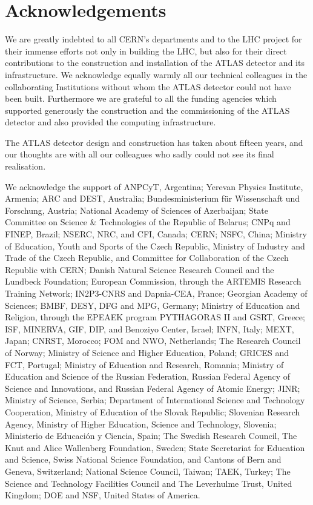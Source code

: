 \documentclass[11pt,a4paper,dvips]{article}
\begin{document}
\section{Acknowledgements}

We are greatly indebted to all CERN's departments and to the LHC project for their immense efforts not only in building the LHC, but also for their direct contributions to the construction and installation of the ATLAS detector and its infrastructure. We acknowledge equally warmly all our technical colleagues in the collaborating Institutions without whom the ATLAS detector could not have been built. Furthermore we are grateful to all the funding agencies which supported generously the construction and the commissioning of the ATLAS detector and also provided the computing infrastructure.

The ATLAS detector design and construction has taken about fifteen years, and our thoughts are with all our colleagues who sadly could not see its final realisation.

We acknowledge the support of ANPCyT, Argentina; Yerevan Physics Institute, Armenia; ARC and DEST, Australia; Bundesministerium f\"ur Wissenschaft und Forschung, Austria; National Academy of Sciences of Azerbaijan; State Committee on Science \& Technologies of the Republic of Belarus; CNPq and FINEP, Brazil; NSERC, NRC, and CFI, Canada; CERN; NSFC, China; Ministry of Education, Youth and Sports of the Czech Republic, Ministry of Industry and Trade of the Czech Republic, and Committee for Collaboration of the Czech Republic with CERN; Danish Natural Science Research Council and the Lundbeck Foundation; European Commission, through the ARTEMIS Research Training Network; IN2P3-CNRS and Dapnia-CEA, France; Georgian Academy of Sciences; BMBF, DESY, DFG and MPG, Germany; Ministry of Education and Religion, through the EPEAEK program PYTHAGORAS II and GSRT, Greece; ISF, MINERVA, GIF, DIP, and Benoziyo Center, Israel; INFN, Italy; MEXT, Japan; CNRST, Morocco; FOM and NWO, Netherlands; The Research Council of Norway; Ministry of Science and Higher Education, Poland; GRICES and FCT, Portugal; Ministry of Education and Research, Romania; Ministry of Education and Science of the Russian Federation, Russian Federal Agency of Science and Innovations, and Russian Federal Agency of Atomic Energy; JINR; Ministry of Science, Serbia; Department of International Science and Technology Cooperation, Ministry of Education of the Slovak Republic; Slovenian Research Agency, Ministry of Higher Education, Science and Technology, Slovenia; Ministerio de Educaci\'{o}n y Ciencia, Spain; The Swedish Research Council, The Knut and Alice Wallenberg Foundation, Sweden; State Secretariat for Education and Science, Swiss National Science Foundation, and Cantons of Bern and Geneva, Switzerland; National Science Council, Taiwan; TAEK, Turkey; The Science and Technology Facilities Council and The Leverhulme Trust, United Kingdom; DOE and NSF, United States of America. 
\end{document}
